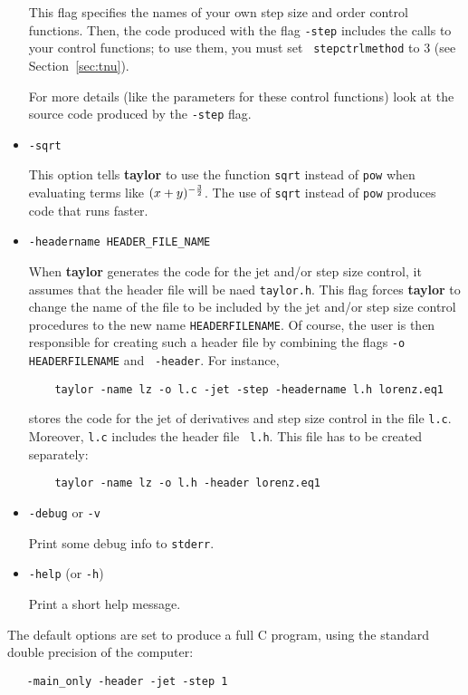\documentclass[10pt]{article}
\theoremstyle{remark}
\newcommand{\taylorname}{{\bf taylor}}
\begin{document}
\begin{itemize}
{This flag specifies the names of your own step size and order control
functions. Then, the code produced with the flag {\tt -step} includes
the calls to your control functions; to use them, you must set {\tt
  stepctrlmethod} to 3 (see
Section~\ref{sec:tnu}).

For more details (like the parameters for these control functions)
look at the source code produced by the {\tt -step} flag.  }

\item{\verb+-sqrt+

This option tells \taylorname{} to use the function \verb+sqrt+
instead of \verb+pow+ when evaluating terms like $(x+y)^{-{3\over
    2}}$.  The use of {\tt sqrt} instead of {\tt pow} produces code
that runs faster.}

\item{\verb+-headername HEADER_FILE_NAME+

When \taylorname{} generates the code for the jet and/or step size
control, it assumes that the header file will be naed {\tt taylor.h}.
This flag forces \taylorname{} to change the name of the file to be
included by the jet and/or step size control procedures to the new
name {\tt HEADERFILENAME}. Of course, the user
is then responsible for creating such a header file by combining the
flags {\tt -o HEADERFILENAME} and {\tt
  -header}. For instance,
\begin{verbatim}
    taylor -name lz -o l.c -jet -step -headername l.h lorenz.eq1
\end{verbatim}
stores the code for the jet of derivatives and step size control in
the file {\tt l.c}. Moreover, {\tt l.c} includes the header file {\tt
  l.h}. This file has to be created separately:
\begin{verbatim}
    taylor -name lz -o l.h -header lorenz.eq1
\end{verbatim}
}

\item{\verb+-debug+ or \verb+-v+ 

Print some debug info to \verb+stderr+.}

\item{\verb+-help+ (or \verb+-h+)

Print a short help message.}

\end{itemize}

\noindent
The default options are set to produce a full C program, using the
standard double precision of the computer:
\begin{verbatim}
   -main_only -header -jet -step 1
\end{verbatim}
\end{document}
